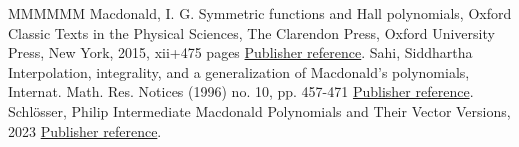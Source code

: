 \begin{thebibliography}{MMMMMM}
 Macdonald, I. G. Symmetric functions and Hall polynomials, Oxford Classic Texts in the Physical Sciences, The Clarendon Press, Oxford University Press, New York, 2015, xii+475 pages \href{https://alco.centre-mersenne.org/articles/10.5802/alco.388/#MR3443860}{Publisher reference}.
 Sahi, Siddhartha Interpolation, integrality, and a generalization of Macdonald’s polynomials, Internat. Math. Res. Notices (1996) no. 10, pp. 457-471 \href{https://alco.centre-mersenne.org/articles/10.5802/alco.388/#MR1399411}{Publisher reference}.
 Schlösser, Philip Intermediate Macdonald Polynomials and Their Vector Versions, 2023 \href{https://alco.centre-mersenne.org/articles/10.5802/alco.388/#Schlosser}{Publisher reference}.
\end{thebibliography}
